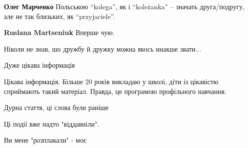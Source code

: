 \begin{itemize}
\begin{itemize}
\textbf{Олег Марченко}
Польською \enquote{kolega}, як і \enquote{koleżanka} – значать друга/подругу, але не так близьких, як \enquote{przyjaciele}.

 
\textbf{Ruslana Martseniuk}
Вперше чую.

Ніколи не знав, шо дружбу й дружку можна якось инакше звати...

\end{itemize}

 
Дуже цікава інформація

 

Цікава інформація. Більше 20 років викладаю у школі, діти із цікавістю
сприймають такий матеріал. Правда, це програмою профільного навчання.


 
Дурна стаття, ці слова були раніше

 

Ці події вже надто "віддавніли".

Ви мене "розплакали" - моє

 


\end{itemize}
